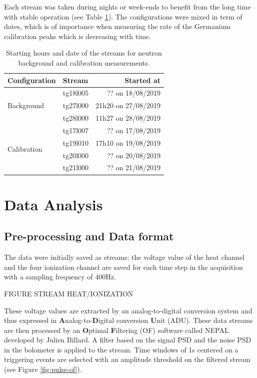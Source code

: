 Each stream was taken during nights or week-ends to benefit from the long time with stable operation (see Table \ref{tab:neutron-streams}). The configurations were mixed in term of dates, which is of importance when measuring the rate of the Germanium calibration peaks which is decreasing with time.

\begin{table}[]
\centering
\begin{tabular}{l|l|r}
Configuration                & Stream   & Started at          \\ \hline
\multirow{3}{*}{Background}  & tg18l005 & ?? on 18/08/2019    \\
                             & tg27l000 & 21h20 on 27/08/2019 \\
                             & tg28l000 & 11h27 on 28/08/2019 \\ \hline
\multirow{4}{*}{Calibration} & tg17l007 & ?? on 17/08/2019    \\
                             & tg19l010 & 17h10 on 19/08/2019 \\
                             & tg20l000 & ?? on 20/08/2019    \\
                             & tg21l000 & ?? on 21/08/2019   
\end{tabular}
\caption{Starting hours and date of the streams for neutron background and calibration measurements.}
\label{tab:neutron-streams}
\end{table}


\section{Data Analysis}


\subsection{Pre-processing and Data format}
\label{par:data-format}

The data were initially saved as streams: the voltage value of the heat channel and the four ionization channel are saved for each time step in the acquisition with a sampling frequency of 400Hz. 

{\color{red} FIGURE STREAM HEAT/IONIZATION}

These voltage values are extracted by an analog-to-digital conversion system and thus expressed in \textbf{A}nalog-to-\textbf{D}igital conversion \textbf{U}nit (ADU).
These data streams are then processed by an \textbf{O}ptimal \textbf{F}iltering (OF) software called NEPAL developed by Julien Billard. A filter based on the signal PSD and the noise PSD in the bolometer is applied to the stream. Time windows of 1s centered on a triggering events are selected with an amplitude threshold on the filtered stream (see Figure \ref{fig:pulse-of}).

